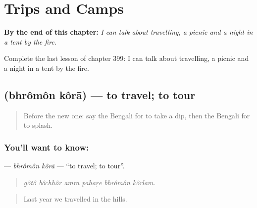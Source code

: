 
\chapter{Trips and Camps}
\label{ch:bn-trips-and-camps}

\begin{chapteropening}
\textbf{By the end of this chapter:} \emph{I can talk about travelling, a picnic and a night in a tent by the fire.}

Complete the last lesson of chapter 399: I can talk about travelling, a picnic and a night in a tent by the fire.
\end{chapteropening}

\section[\texorpdfstring{\bn{ভ্রমণ} \bn{করা} (bhrômôn kôrā)}{ভ্রমণ করা (bhrômôn kôrā)}]{  (bhrômôn kôrā) — to travel; to tour}

\label{lesson:BN-C399-bhromon-kora}



\begin{quote}
Before the new one: say the Bengali for to take a dip, then the Bengali for to splash.
\end{quote}

\subsection*{You'll want to know:  }
\textbf{ } — \emph{bhrômôn kôrā} — \textquotedblleft{}to travel; to tour\textquotedblright{}.

\begin{quote}
     
\end{quote}

\begin{quote}
\emph{gôtô bôchhôr āmrā pāhāṛe bhrômôn kôrlām.}
\end{quote}

\begin{quote}
Last year we travelled in the hills.
\end{quote}

